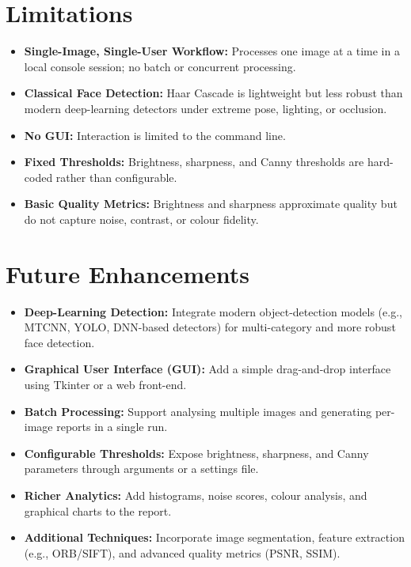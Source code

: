 \documentclass[11pt,a4paper]{article}
\begin{document}
\section{Limitations}
\begin{itemize}[leftmargin=1.5em, nosep]
    \item \textbf{Single-Image, Single-User Workflow:} Processes one image at a time in a local console session; no batch or concurrent processing.
    \item \textbf{Classical Face Detection:} Haar Cascade is lightweight but less robust than modern deep-learning detectors under extreme pose, lighting, or occlusion.
    \item \textbf{No GUI:} Interaction is limited to the command line.
    \item \textbf{Fixed Thresholds:} Brightness, sharpness, and Canny thresholds are hard-coded rather than configurable.
    \item \textbf{Basic Quality Metrics:} Brightness and sharpness approximate quality but do not capture noise, contrast, or colour fidelity.
\end{itemize}

\section{Future Enhancements}
\begin{itemize}[leftmargin=1.5em, nosep]
    \item \textbf{Deep-Learning Detection:} Integrate modern object-detection models (e.g., MTCNN, YOLO, DNN-based detectors) for multi-category and more robust face detection.
    \item \textbf{Graphical User Interface (GUI):} Add a simple drag-and-drop interface using Tkinter or a web front-end.
    \item \textbf{Batch Processing:} Support analysing multiple images and generating per-image reports in a single run.
    \item \textbf{Configurable Thresholds:} Expose brightness, sharpness, and Canny parameters through arguments or a settings file.
    \item \textbf{Richer Analytics:} Add histograms, noise scores, colour analysis, and graphical charts to the report.
    \item \textbf{Additional Techniques:} Incorporate image segmentation, feature extraction (e.g., ORB/SIFT), and advanced quality metrics (PSNR, SSIM).
\end{itemize}
\end{document}
